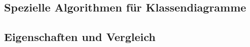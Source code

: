 \subsection{Spezielle Algorithmen für Klassendiagramme}







\subsection{Eigenschaften und Vergleich}







